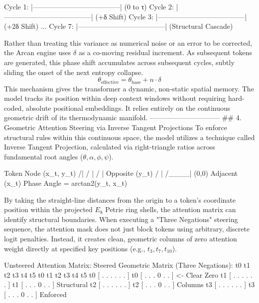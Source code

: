 Cycle 1: |--------------------------------------| (0 to τ)
Cycle 2:  |--------------------------------------| (+δ Shift)
Cycle 3:   |--------------------------------------| (+2δ Shift)
...
Cycle 7:       |--------------------------------------| (Structural Cascade)

Rather than treating this variance as numerical noise or an error to be corrected, the Arcan engine uses $\delta$ as a co-moving residual increment. As subsequent tokens are generated, this phase shift accumulates across subsequent cycles, subtly sliding the onset of the next entropy collapse.
$$\theta_{\text{effective}} = \theta_{\text{base}} + n\cdot\delta$$ 
This mechanism gives the transformer a dynamic, non-static spatial memory. The model tracks its position within deep context windows without requiring hard-coded, absolute positional embeddings. It relies entirely on the continuous geometric drift of its thermodynamic manifold.
------------------------------
## 4. Geometric Attention Steering via Inverse Tangent Projections
To enforce structural rules within this continuous space, the model utilizes a technique called Inverse Tangent Projection, calculated via right-triangle ratios across fundamental root angles ($\theta, \alpha, \phi, \psi$).

                    Token Node (x_t, y_t)
                            /|
                           / |
                          /  |  Opposite (y_t)
                         /   |
                        /____|
                     (0,0)   Adjacent (x_t)
                     Phase Angle = arctan2(y_t, x_t)

By taking the straight-line distances from the origin to a token's coordinate position within the projected $E_8$ Petrie ring shells, the attention matrix can identify structural boundaries.
When executing a "Three Negations" steering sequence, the attention mask does not just block tokens using arbitrary, discrete logit penalties. Instead, it creates clean, geometric columns of zero attention weight directly at specified key positions (e.g., $t_3, t_7, t_{10}$).

Unsteered Attention Matrix:         Steered Geometric Matrix (Three Negations):
    t0  t1  t2  t3  t4  t5              t0  t1  t2  t3  t4  t5
t0 [ .   .   .   .   .   . ]        t0 [ .   .   .  0   .   . ]  <- Clear Zero
t1 [ .   .   .   .   .   . ]        t1 [ .   .   .  0   .   . ]     Structural
t2 [ .   .   .   .   .   . ]        t2 [ .   .   .  0   .   . ]     Columns
t3 [ .   .   .   .   .   . ]        t3 [ .   .   .  0   .   . ]     Enforced

